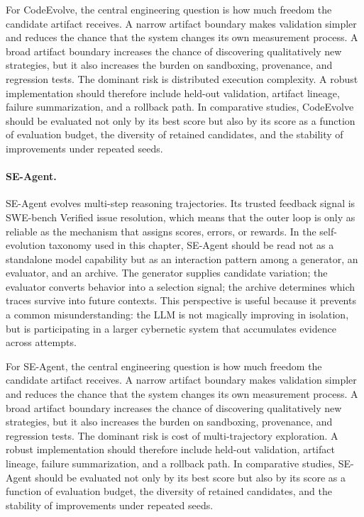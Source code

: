 For CodeEvolve, the central engineering question is how much freedom the candidate artifact receives.  A narrow artifact boundary makes validation simpler and reduces the chance that the system changes its own measurement process.  A broad artifact boundary increases the chance of discovering qualitatively new strategies, but it also increases the burden on sandboxing, provenance, and regression tests.  The dominant risk is distributed execution complexity.  A robust implementation should therefore include held-out validation, artifact lineage, failure summarization, and a rollback path.  In comparative studies, CodeEvolve should be evaluated not only by its best score but also by its score as a function of evaluation budget, the diversity of retained candidates, and the stability of improvements under repeated seeds.

\paragraph{SE-Agent.} SE-Agent evolves multi-step reasoning trajectories.  Its trusted feedback signal is SWE-bench Verified issue resolution, which means that the outer loop is only as reliable as the mechanism that assigns scores, errors, or rewards.  In the self-evolution taxonomy used in this chapter, SE-Agent should be read not as a standalone model capability but as an interaction pattern among a generator, an evaluator, and an archive.  The generator supplies candidate variation; the evaluator converts behavior into a selection signal; the archive determines which traces survive into future contexts.  This perspective is useful because it prevents a common misunderstanding: the LLM is not magically improving in isolation, but is participating in a larger cybernetic system that accumulates evidence across attempts.

For SE-Agent, the central engineering question is how much freedom the candidate artifact receives.  A narrow artifact boundary makes validation simpler and reduces the chance that the system changes its own measurement process.  A broad artifact boundary increases the chance of discovering qualitatively new strategies, but it also increases the burden on sandboxing, provenance, and regression tests.  The dominant risk is cost of multi-trajectory exploration.  A robust implementation should therefore include held-out validation, artifact lineage, failure summarization, and a rollback path.  In comparative studies, SE-Agent should be evaluated not only by its best score but also by its score as a function of evaluation budget, the diversity of retained candidates, and the stability of improvements under repeated seeds.

